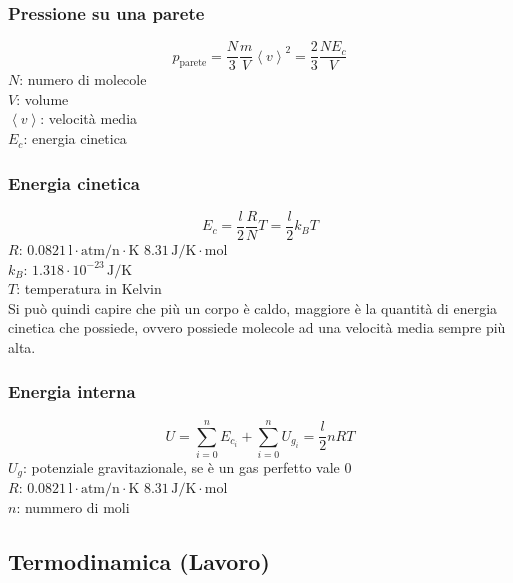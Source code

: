\subsubsection{Pressione su una parete}
\begin{equation*}
p_{\text{parete}} = \frac{N}{3}\frac{m}{V}\left\langle v\right\rangle^2 = \frac{2}{3}\frac{NE_c}{V}
\end{equation*}
$N$: numero di molecole\\
$V$: volume\\
$\left\langle v\right\rangle$: velocità media\\
$E_c$: energia cinetica\\

\subsubsection{Energia cinetica}
\begin{equation*}
E_c = \frac{l}{2}\frac{R}{N}T = \frac{l}{2}k_BT
\end{equation*}
\hyperref[tab:R]{$R$}: $0.0821\,\text{l}\cdot\text{atm/n}\cdot\text{K}$
$8.31\,\text{J/K}\cdot\text{mol}$\\
\hyperref[tab:kB]{$k_B$}: $1.318\cdot10^{-23}\,\text{J/K}$\\
$T$: temperatura in Kelvin\\[\baselineskip]

Si può quindi capire che più un corpo è caldo, maggiore è la quantità di energia cinetica che possiede,
ovvero possiede molecole ad una velocità media sempre più alta.

\subsubsection{Energia interna}
\begin{equation*}
U = \sum\limits_{i=0}^{n} E_{c_i} + \sum\limits_{i=0}^{n} U_{g_i} = \frac{l}{2}nRT
\end{equation*}
$U_g$: potenziale gravitazionale, se è un gas perfetto vale $0$\\
\hyperref[tab:R]{$R$}: $0.0821\,\text{l}\cdot\text{atm/n}\cdot\text{K}$
$8.31\,\text{J/K}\cdot\text{mol}$\\
$n$: nummero di moli

\subsection{Termodinamica (Lavoro)}

